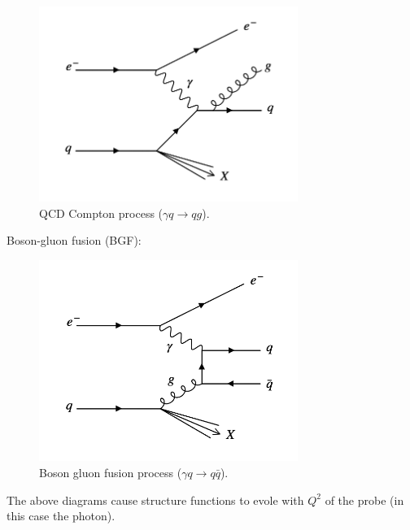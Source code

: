 \begin{figure}[!htb]
  \begin{center}
    \includegraphics[width=0.75\textwidth]{images/web_feynman/image_38.png}
    \caption[QCD Compton process]{QCD Compton process ($\gamma q \to qg$).}
    \label{fig:ch11_GammaQToGQ}
  \end{center}
\end{figure}

Boson-gluon fusion (BGF):

\begin{figure}[!htb]
  \begin{center}
    \includegraphics[width=0.75\textwidth]{images/web_feynman/image_39.png}
    \caption[Boson gluon fusion process]{Boson gluon fusion process ($\gamma q \to q\bar{q}$).}
    \label{fig:ch11_GammaQToQQ}
  \end{center}
\end{figure}

The above diagrams cause structure functions to evole with $Q^2$ of the probe (in this case the photon).

